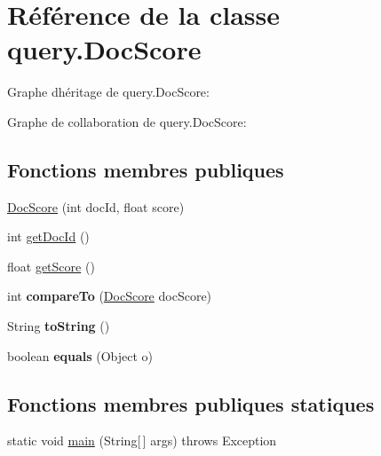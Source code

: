 \hypertarget{classquery_1_1DocScore}{}\section{Référence de la classe query.\+Doc\+Score}
\label{classquery_1_1DocScore}


Graphe d\textquotesingle{}héritage de query.\+Doc\+Score\+:


Graphe de collaboration de query.\+Doc\+Score\+:
\subsection*{Fonctions membres publiques}
\begin{DoxyCompactItemize}
\item 
\hyperlink{classquery_1_1DocScore_aab792c66a796267c8c8aab62e897e49b}{Doc\+Score} (int doc\+Id, float score)
\item 
int \hyperlink{classquery_1_1DocScore_afeca8ed1596e722c014c8ce05dc06de0}{get\+Doc\+Id} ()
\item 
float \hyperlink{classquery_1_1DocScore_a0d91b05afa65f26024148990787ff146}{get\+Score} ()
\item 
\mbox{\label{classquery_1_1DocScore_a42cf0dc73ed1af5482cc16b0db2a5c6d}} 
int {\bfseries compare\+To} (\hyperlink{classquery_1_1DocScore}{Doc\+Score} doc\+Score)
\item 
\mbox{\label{classquery_1_1DocScore_a9e1277dcea23c8fd1817d749349f6cb1}} 
String {\bfseries to\+String} ()
\item 
\mbox{\label{classquery_1_1DocScore_abd904693bc6cb09695e2029bb8934a3a}} 
boolean {\bfseries equals} (Object o)
\end{DoxyCompactItemize}
\subsection*{Fonctions membres publiques statiques}
\begin{DoxyCompactItemize}
\item 
static void \hyperlink{classquery_1_1DocScore_ab28f1cd5999cd2497715886c35aaf33f}{main} (String\mbox{[}$\,$\mbox{]} args)  throws Exception  	
\end{DoxyCompactItemize}


